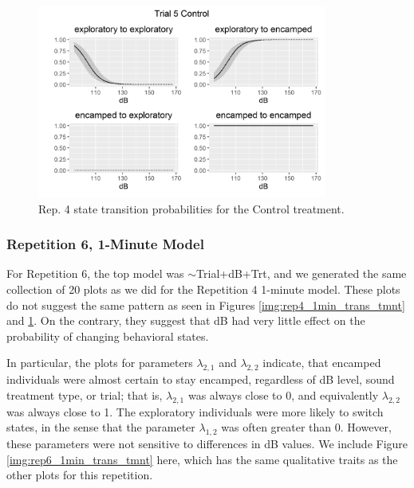 \documentclass[12pt]{article}
\begin{document}
			\begin{figure}
				\centering
				\includegraphics[width=0.85\textwidth]{trans_rep_4_trial_5_Control.png}
				\caption{Rep. 4 state transition probabilities for the Control treatment.}
				\label{img:rep4_1min_trans_control}
			\end{figure}
			
		\subsubsection{Repetition 6, 1-Minute Model}
		
			For Repetition 6, the top model was $\sim$Trial+dB+Trt, and we generated the same collection of 20 plots as we did for the Repetition 4 1-minute model. These plots do not suggest the same pattern as seen in Figures \ref{img:rep4_1min_trans_tmnt} and \ref{img:rep4_1min_trans_control}. On the contrary, they suggest that dB had very little effect on the probability of changing behavioral states. 
			
			In particular, the plots for parameters $\lambda_{2, 1}$ and $\lambda_{2, 2}$ indicate, that encamped individuals were almost certain to stay encamped, regardless of dB level, sound treatment type, or trial; that is, $\lambda_{2, 1}$ was always close to 0, and equivalently $\lambda_{2, 2}$ was always close to 1. The exploratory individuals were more likely to switch states, in the sense that the parameter $\lambda_{1, 2}$ was often greater than 0. However, these parameters were not sensitive to differences in dB values. We include Figure \ref{img:rep6_1min_trans_tmnt} here, which has the same qualitative traits as the other plots for this repetition.
			
\end{document}
